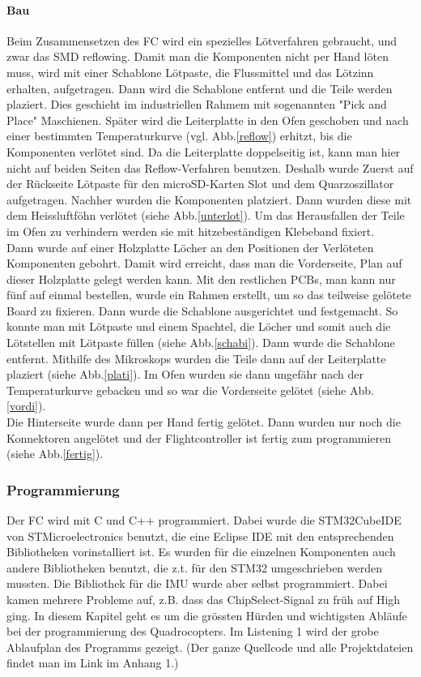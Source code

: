 \documentclass[12pt,a4paper, ngerman]{article}
\begin{document}
\paragraph{Bau}
Beim Zusammensetzen des FC wird ein spezielles Lötverfahren gebraucht, und zwar das SMD reflowing. Damit man die Komponenten nicht per Hand löten muss, wird mit einer Schablone Lötpaste, die Flussmittel und das Lötzinn erhalten, aufgetragen. Dann wird die Schablone entfernt und die Teile werden plaziert. Dies geschieht im industriellen Rahmem mit sogenannten "Pick and Place" Maschienen. Später wird die Leiterplatte in den Ofen geschoben und nach einer bestimmten Temperaturkurve (vgl. Abb.\ref{reflow}) erhitzt, bis die Komponenten verlötet sind\cite{website:sauter-elektronik.de_reflow}.
Da die Leiterplatte doppelseitig ist, kann man hier nicht auf beiden Seiten das Reflow-Verfahren benutzen. Deshalb wurde Zuerst auf der Rückseite Lötpaste für den microSD-Karten Slot und dem Quarzoszillator aufgetragen. Nachher wurden die Komponenten platziert. Dann wurden diese mit dem Heissluftföhn verlötet (siehe Abb.\ref{unterlot}). Um das Herausfallen der Teile im Ofen zu verhindern werden sie mit hitzebeständigen Klebeband fixiert. \\
Dann wurde auf einer Holzplatte Löcher an den Positionen der Verlöteten Komponenten gebohrt. Damit wird erreicht, dass man die Vorderseite, Plan auf dieser Holzplatte gelegt werden kann. Mit den restlichen PCBs, man kann nur fünf auf einmal bestellen, wurde ein Rahmen erstellt, um so das teilweise gelötete Board zu fixieren. Dann wurde die Schablone ausgerichtet und festgemacht. So konnte man mit Lötpaste und einem Spachtel, die Löcher und somit auch die Lötstellen mit Lötpaste füllen (siehe Abb.\ref{schabi}). 
Dann wurde die Schablone entfernt. Mithilfe des Mikroskops wurden die Teile dann auf der Leiterplatte plaziert (siehe Abb.\ref{plati}). 
Im Ofen wurden sie dann ungefähr nach der Temperaturkurve gebacken und so war die Vorderseite gelötet (siehe Abb. \ref{vordi}). \\ 
Die Hinterseite wurde dann per Hand fertig gelötet. Dann wurden nur noch die Konnektoren angelötet und der Flightcontroller ist fertig zum programmieren (siehe Abb.\ref{fertig}).
\subsubsection{Programmierung}
Der FC wird mit C und C++ programmiert. Dabei wurde die STM32CubeIDE von STMicroelectronics benutzt, die eine Eclipse IDE mit den entsprechenden Bibliotheken vorinstalliert ist. Es wurden für die einzelnen Komponenten auch andere Bibliotheken benutzt, die z.t. für den STM32 umgeschrieben werden mussten. Die Bibliothek für die IMU wurde aber selbst programmiert. Dabei kamen mehrere Probleme auf, z.B. dass das ChipSelect-Signal zu früh auf High ging. In diesem Kapitel geht es um die grössten Hürden und wichtigsten Abläufe bei der programmierung des Quadrocopters. Im Listening 1 wird der grobe Ablaufplan des Programms gezeigt. (Der ganze Quellcode und alle Projektdateien findet man im Link im Anhang 1.)
\end{document}
